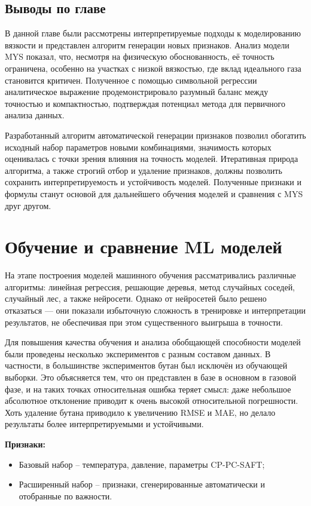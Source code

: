 \documentclass[a4paper,12pt]{article}
\begin{document}
  \subsection{Выводы по главе}

    В данной главе были рассмотрены интерпретируемые подходы к моделированию вязкости и представлен алгоритм генерации новых признаков. Анализ модели MYS показал, что, несмотря на физическую обоснованность, её точность ограничена, особенно на участках с низкой вязкостью, где вклад идеального газа становится критичен. Полученное с помощью символьной регрессии аналитическое выражение продемонстрировало разумный баланс между точностью и компактностью, подтверждая потенциал метода для первичного анализа данных.
    
    Разработанный алгоритм автоматической генерации признаков позволил обогатить исходный набор параметров новыми комбинациями, значимость которых оценивалась с точки зрения влияния на точность моделей. Итеративная природа алгоритма, а также строгий отбор и удаление признаков, должны позволить сохранить интерпретируемость и устойчивость моделей. Полученные признаки и формулы станут основой для дальнейшего обучения моделей и сравнения с MYS друг другом.
\newpage

\section{Обучение и сравнение ML моделей}

  На этапе построения моделей машинного обучения рассматривались различные алгоритмы: линейная регрессия, решающие деревья, метод случайных соседей, случайный лес, а также нейросети. Однако от нейросетей было решено отказаться — они показали избыточную сложность в тренировке и интерпретации результатов, не обеспечивая при этом существенного выигрыша в точности.
  
  Для повышения качества обучения и анализа обобщающей способности моделей были проведены несколько экспериментов с разным составом данных. В частности, в большинстве экспериментов бутан был исключён из обучающей выборки. Это объясняется тем, что он представлен в базе в основном в газовой фазе, и на таких точках относительная ошибка теряет смысл: даже небольшое абсолютное отклонение приводит к очень высокой относительной погрешности. Хоть удаление бутана приводило к увеличению RMSE и MAE, но делало результаты более интерпретируемыми и устойчивыми.
  
  \begin{minipage}{\textwidth}
    \textbf{Признаки:}
    \begin{itemize}
      \item Базовый набор -- температура, давление, параметры CP-PC-SAFT;
      \item Расширенный набор -- признаки, сгенерированные автоматически и отобранные по важности.
    \end{itemize}
  \end{minipage}
  
\end{document}
